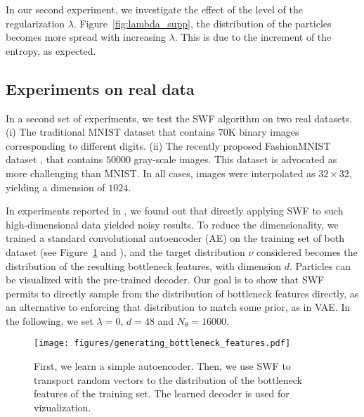 

In our second experiment, we investigate the effect of the level of the regularization $\lambda$. Figure~\ref{fig:lambda_supp}, the distribution of the particles becomes more spread with increasing $\lambda$. This is due to the increment of the entropy, as expected.

\subsection{Experiments on real data}

In a second set of experiments, we test the SWF algorithm on two real datasets. (i) The traditional MNIST dataset that contains 70K binary images corresponding to different digits. (ii) The recently proposed FashionMNIST dataset \cite{xiao2017fashion}, that contains $50000$ gray-scale images. This dataset is advocated as more challenging than MNIST. In all cases, images were interpolated as $32\times 32$, yielding a dimension of $1024$.

In experiments reported in \supp, we found out that directly applying SWF to such high-dimensional data yielded noisy results. To reduce the dimensionality, we trained a standard convolutional autoencoder (AE) on the training set of both dataset (see Figure~\ref{fig:using_ae} and \supp), and the target distribution $\nu$ considered becomes the distribution of the resulting bottleneck features,
with dimension $d$. Particles can be visualized with the pre-trained decoder.
Our goal is to show that SWF permits to directly sample from the distribution of bottleneck features directly, as an alternative to enforcing that distribution to match some prior, as in VAE. In the following, we set $\lambda=0$, $d=48$ and $N_\theta=16000$.

\begin{figure}
\centering
\texttt{[image: figures/generating\_bottleneck\_features.pdf]}
\caption{First, we learn a simple autoencoder. Then, we use SWF to transport random vectors to the distribution of the bottleneck features of the training set. The learned decoder is used for vizualization.}
\label{fig:using_ae}
\vspace{-10pt}
\end{figure}


